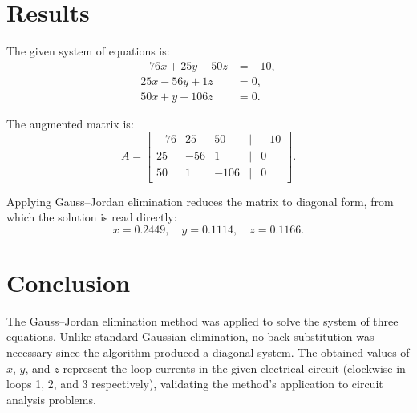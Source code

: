 \section*{Results} 
The given system of equations is:
\[
\begin{aligned}
-76x + 25y + 50z &= -10, \\
25x - 56y + 1z &= 0, \\
50x + y - 106z &= 0.
\end{aligned}
\]

The augmented matrix is:
\[
A =
\begin{bmatrix}
-76 & 25 & 50 & | & -10 \\
25 & -56 & 1 & | & 0 \\
50 & 1 & -106 & | & 0
\end{bmatrix}.
\]

Applying Gauss–Jordan elimination reduces the matrix to diagonal form, from which the solution is read directly:
\[
x = 0.2449, \quad y = 0.1114, \quad z = 0.1166.
\]

\section*{Conclusion} 
The Gauss–Jordan elimination method was applied to solve the system of three equations. Unlike standard Gaussian elimination, no back-substitution was necessary since the algorithm produced a diagonal system. The obtained values of $x$, $y$, and $z$ represent the loop currents in the given electrical circuit (clockwise in loops 1, 2, and 3 respectively), validating the method’s application to circuit analysis problems.

